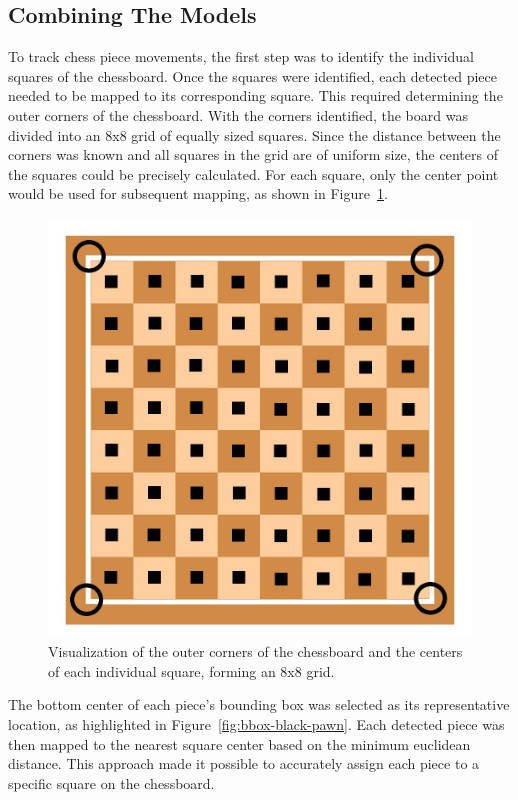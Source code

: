 \newpage


\subsection{Combining The Models}

To track chess piece movements, the first step was to identify the individual squares of the chessboard. Once the squares were identified, each detected piece needed to be mapped to its corresponding square. This required determining the outer corners of the chessboard. With the corners identified, the board was divided into an 8x8 grid of equally sized squares. Since the distance between the corners was known and all squares in the grid are of uniform size, the centers of the squares could be precisely calculated. For each square, only the center point would be used for subsequent mapping, as shown in Figure~\ref{fig:chessboard-centers}.



\begin{figure}[h!]
    \centering
    \includegraphics[width=0.75\linewidth]{figures/methods/ml-models/outer_corners_centers_chessboard.jpg}
    \caption[S]{Visualization of the outer corners of the chessboard and the centers of each individual square, forming an 8x8 grid. \cite{vectorstock:chessboard-svg}}
    \label{fig:chessboard-centers}
\end{figure}


The bottom center of each piece’s bounding box was selected as its representative location, as highlighted in Figure~\ref{fig:bbox-black-pawn}. Each detected piece was then mapped to the nearest square center based on the minimum euclidean distance.  This approach made it possible to accurately assign each piece to a specific square on the chessboard.



